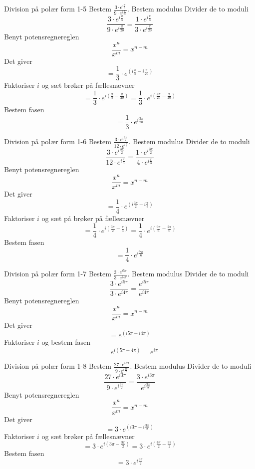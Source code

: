 \documentclass{article}
\begin{document}
\newpage
\begin{exercise}{Division på polær form 1-5}
Bestem $ \frac{3 \cdot e^{i \frac{\pi}{5}}}{9 \cdot e^{i \frac{\pi}{20}}}$.
\hint
Bestem modulus
\hint
Divider de to moduli
\[\frac{3 \cdot e^{i \frac{\pi}{5}}}{9 \cdot e^{i \frac{\pi}{20}}} = \frac{1 \cdot e^{i \frac{\pi}{5}}}{3 \cdot e^{i \frac{\pi}{20}}}
\]
\hint
Benyt potensregnereglen
\[\frac{x^n}{x^m} = x^{n - m}
\]
\hint
Det giver
\[ = \frac{1}{3} \cdot e^{ (i \frac{\pi}{5} - i \frac{\pi}{20}) }
\]
\hint
Faktoriser $i$ og sæt brøker på fællesnævner
\[ = \frac{1}{3} \cdot e^{ i( \frac{\pi}{5} - \frac{\pi}{20}) } = \frac{1}{3} \cdot e^{ i( \frac{4\pi}{20} - \frac{\pi}{20}) }
\]
\hint
Bestem fasen
\[ = \frac{1}{3} \cdot e^{ i \frac{3\pi}{20} }
\]
\end{exercise}
\newpage
\begin{exercise}{Division på polær form 1-6}
Bestem $ \frac{3 \cdot e^{i \frac{3\pi}{2}}}{12 \cdot e^{i \frac{\pi}{3}}}$.
\hint
Bestem modulus
\hint
Divider de to moduli
\[\frac{3 \cdot e^{i \frac{3\pi}{2}}}{12 \cdot e^{i \frac{\pi}{3}}} = \frac{1 \cdot e^{i \frac{3\pi}{2}}}{4 \cdot e^{i \frac{\pi}{3}}}
\]
\hint
Benyt potensregnereglen
\[\frac{x^n}{x^m} = x^{n - m}
\]
\hint
Det giver
\[ = \frac{1}{4} \cdot e^{(i \frac{3 \pi}{2} - i \frac{\pi}{3})}
\]
\hint
Faktoriser $i$ og sæt på brøker på fællesnævner
\[ = \frac{1}{4} \cdot e^{i( \frac{3 \pi}{2} - \frac{\pi}{3})} = \frac{1}{4} \cdot e^{i( \frac{9 \pi}{6} - \frac{2\pi}{6})}
\]
\hint
Bestem fasen
\[ = \frac{1}{4} \cdot e^{i \frac{7\pi}{6}}
\]
\end{exercise}
\newpage
\begin{exercise}{Division på polær form 1-7}
Bestem $ \frac{3 \cdot e^{i 5\pi}}{3 \cdot e^{i 4\pi}}$.
\hint
Bestem modulus
\hint
Divider de to moduli
\[\frac{3 \cdot e^{i 5\pi}}{3 \cdot e^{i 4\pi}} = \frac{e^{i 5\pi}}{e^{i 4\pi}}
\]
\hint
Benyt potensregnereglen
\[\frac{x^n}{x^m} = x^{n - m}
\]
\hint
Det giver
\[ = e^{(i 5\pi - i 4\pi)}
\]
\hint
Faktoriser $i$ og bestem fasen
\[ = e^{i(5\pi - 4\pi)} = e^{i \pi}
\]
\end{exercise}
\newpage
\begin{exercise}{Division på polær form 1-8}
Bestem $ \frac{27\cdot e^{i 3 \pi}}{9 \cdot e^{i \frac{3 \pi}{2}}}$.
\hint
Bestem modulus
\hint
Divider de to moduli
\[\frac{27\cdot e^{i 3 \pi}}{9 \cdot e^{i \frac{3 \pi}{2}}} = \frac{3\cdot e^{i 3 \pi}}{ e^{i \frac{3 \pi}{2}}}
\]
\hint
Benyt potensregnereglen
\[\frac{x^n}{x^m} = x^{n - m}
\]
\hint
Det giver
\[ = 3\cdot e^{(i 3 \pi - i \frac{3 \pi}{2})}
\]
\hint
Faktoriser $i$ og sæt brøker på fællesnævner
\[ = 3\cdot e^{i( 3 \pi - \frac{3 \pi}{2})} = 3 \cdot e^{i( \frac{6 \pi}{2} - \frac{3 \pi}{2})}
\]
\hint
Bestem fasen
\[ = 3 \cdot e^{i \frac{3\pi}{2}}
\]
\end{exercise}
\end{document}
